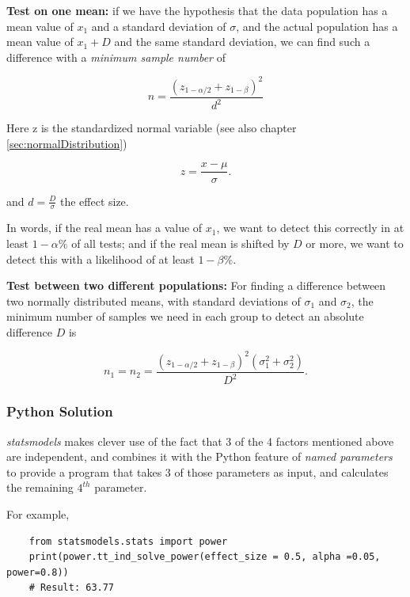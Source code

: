 \textbf{Test on one mean:} if we have the hypothesis that the data population has a mean value of $x_1$ and a standard deviation of $\sigma$, and the actual population has a mean value of $x_1+D$ and the same standard deviation, we can find such a difference with a \emph{minimum sample number} of

\begin{equation}
  n = \frac{{({z_{1 - \alpha /2}} + {z_{1 - \beta }})}^2}{d^2}
\end{equation}

Here z is the standardized normal variable (see also chapter \ref{sec:normalDistribution})

\begin{equation}
  z = \frac{x-\mu}{\sigma} .
\end{equation}

and $d = \frac{D}{\sigma}$ the effect size.

In words, if the real mean has a value of $x_1$, we want to detect this correctly in at least $1-\alpha\%$ of all tests; and if the real mean is shifted by $D$ or more, we want to detect this with a likelihood of at least $1-\beta\%$.

\textbf{Test between two different populations:}
For finding a difference between two normally distributed means, with standard deviations of $\sigma_1$ and $\sigma_2$, the minimum number of samples we need in each group to detect an absolute difference $D$ is

\begin{equation}
  {n_1} = {n_2} = \frac{{({z_{1 - \alpha /2}} + {z_{1 - \beta }})}^2(\sigma _1^2 + \sigma _2^2)}{D^2} .
\end{equation}

\subsubsection{Python Solution}

\emph{statsmodels} makes clever use of the fact that 3 of the 4 factors mentioned above are independent, and combines it with the Python feature of \emph{named parameters} to provide a program that takes 3 of those parameters as input, and calculates the remaining $4^{th}$ parameter.

For example,

\begin{lstlisting}
    from statsmodels.stats import power
    print(power.tt_ind_solve_power(effect_size = 0.5, alpha =0.05, power=0.8))
    # Result: 63.77
\end{lstlisting}

